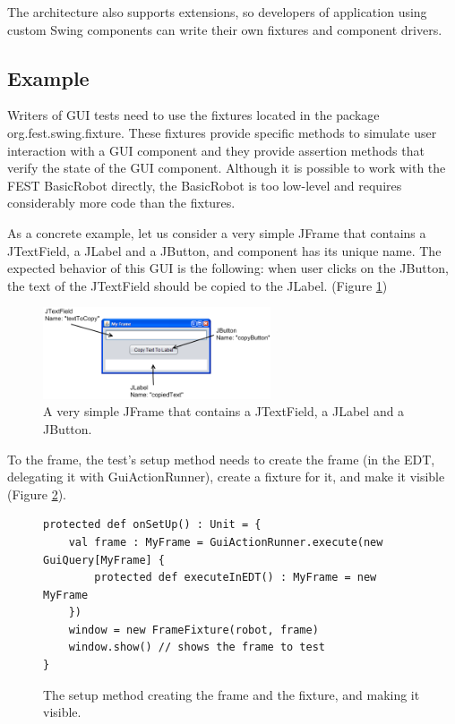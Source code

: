 The architecture also supports extensions, so developers of application using custom Swing components can write their own fixtures and component drivers.

\subsection{Example}

Writers of GUI tests need to use the fixtures located in the package org.fest.swing.fixture. These fixtures provide specific methods to simulate user interaction with a GUI component and they provide assertion methods that verify the state of the GUI component. Although it is possible to work with the FEST BasicRobot directly, the BasicRobot is too low-level and requires considerably more code than the fixtures.

As a concrete example, let us consider a very simple JFrame that contains a JTextField, a JLabel and a JButton, and component has its unique name. The expected behavior of this GUI is the following: when user clicks on the JButton, the text of the JTextField should be copied to the JLabel. (Figure \ref{fig:example_jframe}) 

\begin{figure}[h!] \label{fig:example_jframe}  
  \centering
    \includegraphics[width=0.6\textwidth]{images/example_jframe.png}
  \caption{A very simple JFrame that contains a JTextField, a JLabel and a JButton.}
\end{figure}

To the frame, the test's setup method needs to create the frame (in the EDT, delegating it with GuiActionRunner), create a fixture for it, and make it visible (Figure \ref{fig:example_setup_method}).

\begin{figure}[h!] \label{fig:example_setup_method}
\begin{lstlisting}
protected def onSetUp() : Unit = {
    val frame : MyFrame = GuiActionRunner.execute(new GuiQuery[MyFrame] {
        protected def executeInEDT() : MyFrame = new MyFrame
    })
    window = new FrameFixture(robot, frame)
    window.show() // shows the frame to test
}
\end{lstlisting}
\caption{The setup method creating the frame and the fixture, and making it visible.}
\end{figure}

